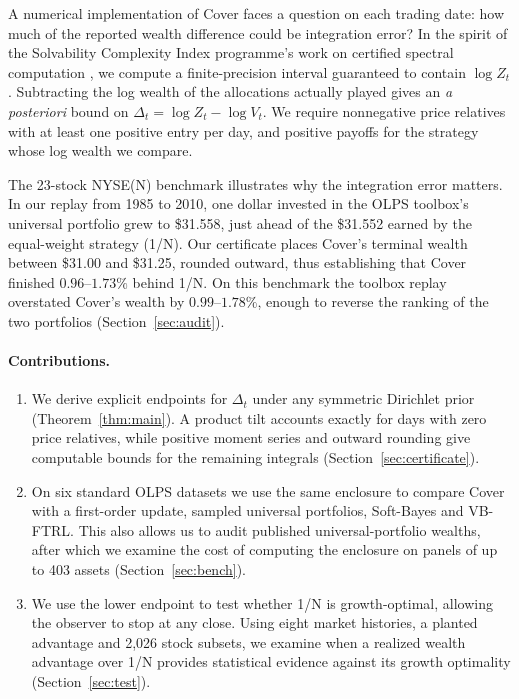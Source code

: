 \documentclass{article}
\numberwithin{equation}{section}
\theoremstyle{remark}
\begin{document}
A numerical implementation of Cover faces a question on each trading
date: how much of the reported wealth difference could be integration
error? In the spirit of the Solvability Complexity Index programme's
work on certified spectral computation
\citep{benartzi2020computing,colbrookhansen2023foundations,chokcolbrook2026},
we compute a finite-precision interval guaranteed to contain
$\log Z_t$. Subtracting the log wealth of the allocations actually
played gives an \emph{a posteriori} bound on
$\Delta_t=\log Z_t-\log V_t$. We require nonnegative price relatives
with at least one positive entry per day, and positive payoffs for the
strategy whose log wealth we compare.

The 23-stock NYSE(N) benchmark \citep{li2014survey,li2016olps} illustrates
why the integration error matters. In our replay from 1985 to 2010, one
dollar invested in the OLPS toolbox's universal portfolio grew to \$31.558,
just ahead of the \$31.552 earned by the equal-weight strategy (1/N). Our certificate places Cover's
terminal wealth between \$31.00 and \$31.25, rounded outward, thus establishing
that Cover finished $0.96$--$1.73\%$ behind 1/N. On this benchmark the toolbox
replay overstated Cover's wealth by $0.99$--$1.78\%$, enough to reverse the
ranking of the two portfolios (Section~\ref{sec:audit}).

\paragraph{Contributions.}
\begin{enumerate}
\item We derive explicit endpoints for $\Delta_t$ under any symmetric
Dirichlet prior (Theorem~\ref{thm:main}). A product tilt accounts exactly for days with zero price
relatives, while positive moment series and outward rounding give computable
bounds for the remaining integrals
(Section~\ref{sec:certificate}).
\item On six standard OLPS datasets we use the same enclosure to compare
Cover with a first-order update, sampled universal portfolios, Soft-Bayes
and VB-FTRL. This also allows us to audit published universal-portfolio
wealths, after which we examine the cost of computing the enclosure on
panels of up to 403 assets (Section~\ref{sec:bench}).
\item We use the lower endpoint to test whether 1/N is growth-optimal,
allowing the observer to stop at any close. Using eight market histories,
a planted advantage and 2,026 stock subsets, we examine when a realized
wealth advantage over 1/N provides statistical evidence against its growth
optimality (Section~\ref{sec:test}).
\end{enumerate}
\end{document}
